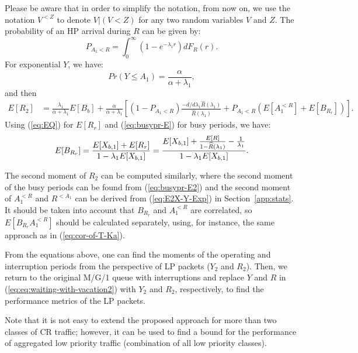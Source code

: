 \documentclass[11pt,journal,oneside,onecolumn,draftclsnofoot]{IEEEtran}
\begin{document}
Please be aware that in order to simplify the notation, from now on, we use the notation $V^{<Z}$  to denote $V|(V<Z)$ for any two random variables $V$ and $Z$.
The probability of an HP arrival during $R$  can be given by:
\begin{equation}
P_{A_1<R}=\int_{0}^{\infty}{(1-e^{-\lambda_1 r})dF_R(r)}.
\end{equation}
For exponential $Y$, we have:
\begin{equation}
Pr(Y \leq A_1)= \frac{\alpha}{\alpha + \lambda_1},
\label{eq:}
\end{equation}
and then
\begin{align}
E[R_2]&=\frac{\lambda_1}{\alpha + \lambda_1} E[B_b]+\frac{\alpha}{\alpha+\lambda_1}\left[(1-P_{A_1<R})\frac{-d/d\lambda_1 \widehat{R}(\lambda_1)}{\widehat{R}(\lambda_1)}+P_{A_1<R}(E[A_1^{<R}]+E[B_{R_r}])\right].
\end{align}
Using (\ref{eq:EQ}) for $E[R_r]$ and (\ref{eq:busypr-E}) for busy periods, we have:
\begin{equation}
E[B_{R_r}]=\frac{E[X_{b,1}]+E[R_r]}{1-\lambda_1E[X_{b,1}]}= \\
\frac{E[X_{b,1}]+\frac{E[R]}{1-\widehat{R}(\lambda_1)}-\frac{1}{\lambda_1}}{1-\lambda_1E[X_{b,1}]}.
\label{eq:}
\end{equation}

The second moment of $R_2$ can be computed similarly, where the second moment of the busy periods can be found from (\ref{eq:busypr-E2}) and the second moment of $A_1^{<R}$ and $R^{<A_1}$ can be derived from (\ref{eq:E2X-Y-Exp}) in Section~\ref{app:stats}. It should be taken into account that $B_{R_r}$ and $A_1^{<R}$ are correlated, so $E[B_{R_r} A_1^{<R}]$ should be calculated separately, using, for instance, the same approach as in (\ref{eq:cor-of-T-Ka}). 



From the equations above, one can find the moments of the operating and interruption periods from the perspective of LP packets ($Y_2$ and $R_2$). Then, we return to the original M/G/1 queue with interruptions and replace $Y$ and $R$ in (\ref{eq:eq:waiting-with-vacation2}) with $Y_2$ and $R_2$, respectively, to find the performance metrics of the LP packets. 

Note that it is not easy to extend the proposed approach for more than two classes of CR traffic; however, it can be used to find a bound for the performance of aggregated low priority traffic (combination of all low priority classes). 
\end{document}
